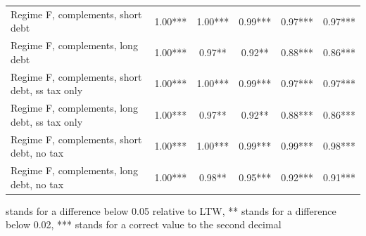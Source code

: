 \documentclass[letterpaper,12pt]{article}%
\begin{document}
\begin{table}[H]
\begin{threeparttable}
\begin{tabular}{l c c c c c}
     \quad Regime F, complements, short debt &   1.00*** & 1.00*** & 0.99*** & 0.97*** & 0.97***  \\
     \quad Regime F, complements, long debt &  1.00*** & 0.97**  & 0.92** &  0.88*** & 0.86***  \\
     \quad Regime F, complements, short debt, ss tax only &  1.00***   &   1.00*** & 0.99*** & 0.97*** & 0.97***  \\
     \quad Regime F, complements, long debt, ss tax only &  1.00*** & 0.97** &  0.92** &  0.88*** & 0.86***\\
     \quad Regime F, complements, short debt, no tax &  1.00*** & 1.00*** &  0.99*** & 0.99***  & 0.98*** \\
     \quad Regime F, complements, long debt, no tax &   1.00*** &  0.98**  & 0.95***  & 0.92*** & 0.91***  \\
     \midrule
    \bottomrule    
    \end{tabular}
    \begin{tablenotes}
    \item * stands for a difference below 0.05 relative to LTW, ** stands for a difference below 0.02, *** stands for a correct value to the second decimal
    \end{tablenotes}
    \label{tab:PPAOutputMultipliers}
    \end{threeparttable}
\end{table}
\end{document}
